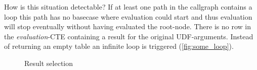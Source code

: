How is this situation detectable? If at least one path in the callgraph contains a loop this path has no basecase where evaluation could start and thus evaluation will stop eventually without having evaluated the root-node. There is no row in the \textit{evaluation}-CTE containing a result for the original UDF-arguments. Instead of returning an empty table an infinite loop is triggered (\autoref{fig:some_loop}).

\begin{figure}[h!]
    \centering
{}
    \caption{Result selection}
    \label{macro:result_collection}
    \vspace*{-3cm}
\end{figure}
